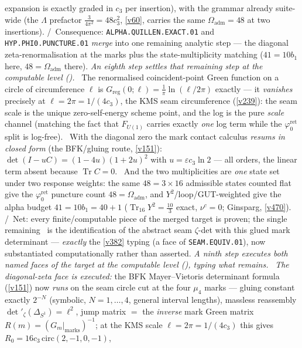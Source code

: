 \documentclass[11pt,a4paper]{article}
\newcommand{\cthree}{c_3}
\newcommand{\phiz}{\varphi_0^{\mathrm{ret}}}
\theoremstyle{definition}
\begin{document}
expansion is exactly graded in $\cthree$ per insertion), with the grammar already suite-wide (the
$\Lambda$ prefactor $\tfrac{3}{4\pi^2}=48\cthree^2$, \vref{v60}, carries the same $\Omega_{\mathrm{adm}}=48$
at two insertions). \mC/\mO\ Consequence: \texttt{ALPHA.QUILLEN.EXACT.01} and \texttt{HYP.PHI0.PUNCTURE.01}
\emph{merge} into one remaining analytic step --- the diagonal zeta-renormalisation at the marks plus the
state-multiplicity matching ($41=10b_1$ here, $48=\Omega_{\mathrm{adm}}$ there).
\emph{An eighth step settles that remaining step at the computable level
().} \mE\ The renormalised coincident-point Green function on a
circle of circumference $\ell$ is $G_{\mathrm{reg}}(0;\ell)=\tfrac1\pi\ln(\ell/2\pi)$ exactly --- it
\emph{vanishes} precisely at $\ell=2\pi=1/(4\cthree)$, the KMS seam circumference (\vref{v239}): the seam
scale is the unique zero-self-energy scheme point, and the log is the pure \emph{scale} channel (matching
the fact that $F_{U(1)}$ carries exactly \emph{one} log term while the $\phiz$ split is log-free). \mE\
With the diagonal zero the mark contact calculus \emph{resums in closed form} (the BFK/gluing route,
\vref{v151}): $\det(I-uC)=(1-4u)(1+2u)^2$ with $u=\varepsilon\cthree\ln2$ --- all orders, the linear term
absent because $\operatorname{Tr}C=0$. \mE\ And the two multiplicities are \emph{one} state set under two
response weights: the same $48=3\times16$ admissible states counted flat give the $\phiz$ puncture count
$48=\Omega_{\mathrm{adm}}$, and $Y^2$/loop/GUT-weighted give the alpha budget $41=10b_1=40+1$
($\operatorname{Tr}_{16}Y^2=\tfrac{10}3$ exact, $\nu^c=0$; Ginsparg, \vref{v470}). \mC/\mO\ Net: every
finite/computable piece of the merged target is proven; the single remaining \mO\ is the identification of
the abstract seam $\zeta$-det with this glued mark determinant --- \emph{exactly} the \vref{v382} typing
(a face of \texttt{SEAM.EQUIV.01}), now substantiated computationally rather than asserted.
\emph{A ninth step executes both named faces of the target at the computable level
(\veri{v974\_alpha\_faces\_computed.py}), typing what remains.} \mE\ \emph{The diagonal-zeta face is
executed:} the BFK Mayer--Vietoris determinant formula (\vref{v151}) now \emph{runs} on the seam circle
cut at the four $\mu_4$ marks --- gluing constant exactly $2^{-N}$ (symbolic, $N=1,\dots,4$, general
interval lengths), massless reassembly $\det\nolimits'_\zeta(\Delta_{S^1})=\ell^2$, jump matrix $=$ the
\emph{inverse} mark Green matrix $R(m)=(G_m|_{\mathrm{marks}})^{-1}$; at the KMS scale
$\ell=2\pi=1/(4\cthree)$ this gives $R_0=16\cthree\,\mathrm{circ}(2,-1,0,-1)$,
\end{document}
